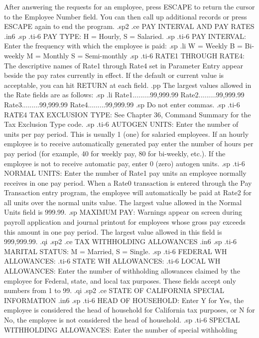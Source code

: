 After answering the requests for an employee, press ESCAPE to return the
cursor to the Employee Number field.  You can then call up additional
records or press ESCAPE again to end the program.
.sp2
.ce
PAY INTERVAL AND PAY RATES
.in6
.sp
.ti-6
PAY TYPE: H = Hourly, S = Salaried.
.sp
.ti-6
PAY INTERVAL: Enter the frequency with which the employee is paid:
.sp
.li
	       W = Weekly
	       B = Bi-weekly
	       M = Monthly
	       S = Semi-monthly
.sp
.ti-6
RATE1 THROUGH RATE4: The descriptive names of Rate1 through Rate4
set in Parameter Entry
appear beside the pay rates currently in effect.  If the default or
current value is acceptable, you can hit RETURN at each field.
.pp
The largest values allowed in the Rate fields are as follows:
.sp
.li
	       Rate1.........99,999.99
	       Rate2.........99,999.99
	       Rate3.........99,999.99
	       Rate4.........99,999.99
.sp
Do not enter commas.
.sp
.ti-6
RATE4 TAX EXCLUSION TYPE:  See Chapter 36, Command Summary for the
Tax Exclusion Type code.
.sp
.ti-6
AUTOGEN UNITS: Enter the number of units per pay period.  This is
usually 1 (one) for salaried employees.  If an hourly employee is to
receive automatically generated pay enter the number of hours per pay
period (for example, 40 for weekly pay, 80 for bi-weekly, etc.).
If the employee is not to receive automatic pay, enter 0 (zero) autogen
units.
.sp
.ti-6
NORMAL UNITS: Enter the number of Rate1 pay units an employee
normally receives in one pay period.  When a Rate0 transaction is entered
through the Pay Transaction entry program, the employee will automatically
be paid at Rate2 for all units over the normal units value.
The largest value allowed in the
Normal Units field is 999.99.
.sp
MAXIMUM PAY: Warnings appear on screen during payroll application and
journal printout for
employees whose gross pay exceeds this amount in one
pay period.
The largest value allowed in this field is 999,999.99.
.qi
.sp2
.ce
TAX WITHHOLDING ALLOWANCES
.in6
.sp
.ti-6
MARITAL STATUS: M = Married, S = Single.
.sp
.ti-6
FEDERAL WH ALLOWANCES:
.ti-6
STATE	WH ALLOWANCES:
.ti-6
LOCAL	WH ALLOWANCES: Enter the number of withholding allowances claimed
by the employee for Federal, state, and local tax purposes.  These fields
accept only numbers from 1 to 99.
.qi
.sp2
.ce
STATE OF CALIFORNIA SPECIAL INFORMATION
.in6
.sp
.ti-6
HEAD OF HOUSEHOLD: Enter Y for Yes, the employee is considered the head
of household for California tax purposes,
or N for No, the employee is not considered
the head of household.
.sp
.ti-6
SPECIAL WITHHOLDING ALLOWANCES: Enter the number of special withholding
